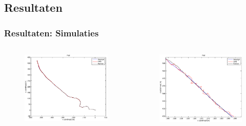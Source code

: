 \documentclass{beamer}
\begin{document}
\subsection{Resultaten}
  \begin{frame}
    \frametitle{Resultaten: Simulaties}
    \begin{columns}[c]
      \begin{column}{.5\textwidth}
        \begin{figure}
          \begin{center}
            \includegraphics[width=\linewidth]{images/simulatie_pad.eps}
          \end{center}
        \end{figure}
      \end{column}
      \begin{column}{.5\textwidth}
        \begin{figure}
          \begin{center}
            \includegraphics[width=\linewidth]{images/simulatie_pad_zoom.eps}

\end{center}
\end{figure}
\end{column}
\end{columns}
\end{frame}
\end{document}
